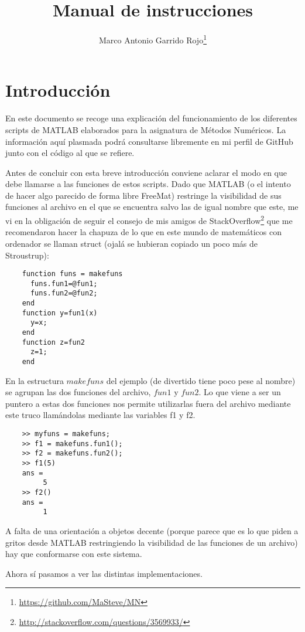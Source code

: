 \documentclass[spanish, a4paper, 12pt] {article}
\begin{document}
\title{Manual de instrucciones}
\author{Marco Antonio Garrido Rojo\thanks{\url{https://github.com/MaSteve/MN}}}
\date{}
\maketitle
\section*{Introducción}
En este documento se recoge una explicación del funcionamiento de los diferentes scripts de MATLAB elaborados para la asignatura de Métodos Numéricos. La información aquí plasmada podrá consultarse libremente en mi perfil de GitHub junto con el código al que se refiere.\\ \par
Antes de concluir con esta breve introducción conviene aclarar el modo en que debe llamarse a las funciones de estos scripts. Dado que MATLAB (o el intento de hacer algo parecido de forma libre FreeMat) restringe la visibilidad de sus funciones al archivo en el que se encuentra salvo las de igual nombre que este, me vi en la obligación de seguir el consejo de mis amigos de StackOverflow\footnote{\url{http://stackoverflow.com/questions/3569933/}} que me recomendaron hacer la chapuza de lo que en este mundo de matemáticos con ordenador se llaman struct (ojalá se hubieran copiado un poco más de Stroustrup):
\begin{verbatim}
    function funs = makefuns
      funs.fun1=@fun1;
      funs.fun2=@fun2;
    end
    function y=fun1(x)
      y=x;
    end
    function z=fun2
      z=1;
    end
\end{verbatim}
\par
En la estructura $makefuns$ del ejemplo (de divertido tiene poco pese al nombre) se agrupan las dos funciones del archivo, $fun1$ y $fun2$. Lo que viene a ser un puntero a estas dos funciones nos permite utilizarlas fuera del archivo mediante este truco llamándolas mediante las variables f1 y f2.
\begin{verbatim}
    >> myfuns = makefuns;
    >> f1 = makefuns.fun1();
    >> f2 = makefuns.fun2();
    >> f1(5)
    ans =
         5
    >> f2()
    ans =
         1
\end{verbatim}
\par
A falta de una orientación a objetos decente (porque parece que es lo que piden a gritos desde MATLAB restringiendo la visibilidad de las funciones de un archivo) hay que conformarse con este sistema.\\ \par
Ahora sí pasamos a ver las distintas implementaciones.
\end{document}
